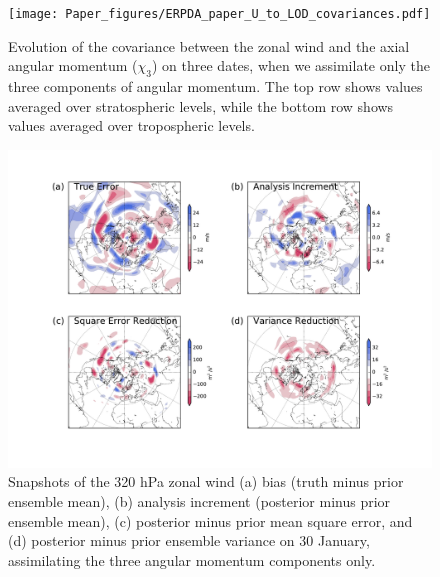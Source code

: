  \begin{figure}
	 \texttt{[image: Paper\_figures/ERPDA\_paper\_U\_to\_LOD\_covariances.pdf]}
	 \caption{Evolution of the covariance between the zonal wind and the axial angular momentum ($\chi_3$) on three dates, when we assimilate only the three components of angular momentum. The top row shows values averaged over stratospheric levels, while the bottom row shows values averaged over tropospheric levels.}
 \label{fig:covariances}
\end{figure}

 \begin{figure}
	 \includegraphics[width=\textwidth]{Paper_figures/ERPDA_paper_U_priorerror_vs_increment_vs_ER_30jan.pdf}
	 \caption{Snapshots of the 320 hPa zonal wind (a) bias (truth minus prior ensemble mean), (b) analysis increment (posterior minus prior ensemble mean), (c) posterior minus prior mean square error, and (d) posterior minus prior ensemble variance on 30 January, assimilating the three angular momentum components only. } 
 \label{fig:error_increments}
\end{figure}


